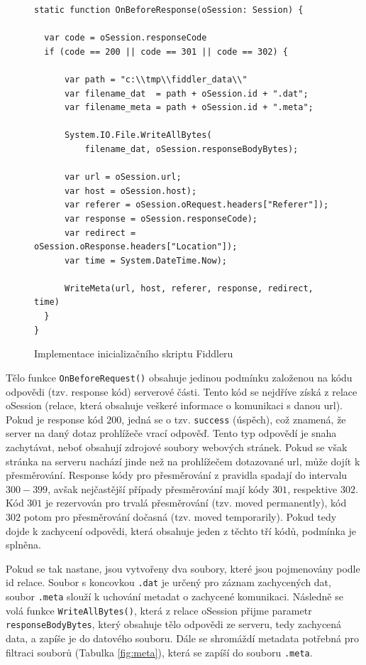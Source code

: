 \documentclass[thesis=M,czech,hidelinks]{FITthesis}[2013/05/06]
\begin{document}
\begin{figure}[h]               
	\begin{verbatim}
static function OnBeforeResponse(oSession: Session) {

  var code = oSession.responseCode
  if (code == 200 || code == 301 || code == 302) {

      var path = "c:\\tmp\\fiddler_data\\"
      var filename_dat  = path + oSession.id + ".dat";
      var filename_meta = path + oSession.id + ".meta";

      System.IO.File.WriteAllBytes(
          filename_dat, oSession.responseBodyBytes);
       
      var url = oSession.url;
      var host = oSession.host);
      var referer = oSession.oRequest.headers["Referer"]);
      var response = oSession.responseCode);
      var redirect = oSession.oResponse.headers["Location"]);
      var time = System.DateTime.Now);
      
      WriteMeta(url, host, referer, response, redirect, time)
  }
}
	\end{verbatim}      
	\caption{Implementace inicializačního skriptu Fiddleru}
	\label{snip:fiddler}
\end{figure}

Tělo funkce \texttt{OnBeforeRequest()} obsahuje jedinou podmínku založenou na kódu odpovědi (tzv. response kód) serverové části. Tento kód se nejdříve získá z relace oSession (relace, která obsahuje veškeré informace o komunikaci s danou url). Pokud je response kód $200$, jedná se o tzv. \texttt{success} (úspěch), což znamená, že server na daný dotaz prohlížeče vrací odpověď. Tento typ odpovědí je snaha zachytávat, neboť obsahují zdrojové soubory webových stránek. Pokud se však stránka na serveru nachází jinde než na prohlížečem dotazované url, může dojít k přesměrování. Response kódy pro přesměrování z pravidla spadají do intervalu $300-399$, avšak nejčastější případy přesměrování mají kódy $301$, respektive $302$. Kód $301$ je rezervován pro trvalá přesměrování (tzv. moved permanently), kód $302$ potom pro přesměrování dočasná (tzv. moved temporarily)\cite{response_codes}. Pokud tedy dojde k zachycení odpovědi, která obsahuje jeden z těchto tří kódů, podmínka je splněna.

Pokud se tak nastane, jsou vytvořeny dva soubory, které jsou pojmenovány podle id relace. Soubor s koncovkou \texttt{.dat} je určený pro záznam zachycených dat, soubor \texttt{.meta} slouží k uchování metadat o zachycené komunikaci. Následně se volá funkce \texttt{WriteAllBytes()}, která z relace oSession přijme parametr \texttt{responseBodyBytes}, který obsahuje tělo odpovědi ze serveru, tedy zachycená data, a zapíše je do datového souboru. Dále se shromáždí metadata potřebná pro filtraci souborů (Tabulka \ref{fig:meta}), která se zapíší do souboru \texttt{.meta}. 
\end{document}
